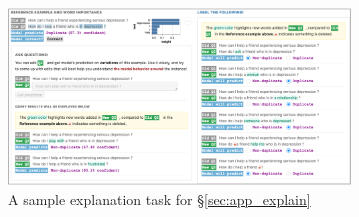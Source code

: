 \begin{figure}[ht]
\centering
\includegraphics[width=0.81\textwidth]{figures/explanation_task_ui}
\vspace{-5pt}
\caption{A sample explanation task for \S\ref{sec:app_explain}}
\vspace{-10pt}
\label{fig:explanation_ui}
\end{figure}

